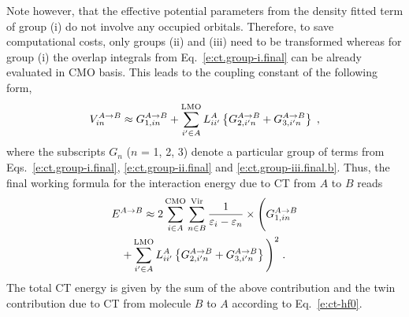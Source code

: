 \documentclass[aip,jcp,amsmath,amssymb,reprint,floatfix]{revtex4-1}
\begin{document}
Note however, that the effective potential parameters from the density fitted term of group (i) 
do not involve any occupied orbitals.
Therefore, to save computational costs, only groups (ii) and (iii) need to be transformed
whereas for group (i) the overlap integrals from Eq.~\eqref{e:ct.group-i.final} 
can be already evaluated in CMO basis.
This leads to the coupling constant of the following form,
%
\begin{equation} \label{e:ect-oep.final-vin}
   V_{in}^{A\rightarrow B} \approx 
%
   G_{1,in}^{A\rightarrow B} \\
  +
   \sum_{i'\in A}^{\rm LMO} L_{ii'}^A
   \left\{
   G_{2,i'n}^{A\rightarrow B}
  +G_{3,i'n}^{A\rightarrow B}
  \right\} \;,
\end{equation}
%
where the subscripts $G_n$ ($n$ = 1, 2, 3) denote a particular group of 
terms from Eqs.~\eqref{e:ct.group-i.final}, \eqref{e:ct.group-ii.final} 
and \eqref{e:ct.group-iii.final.b}.
Thus, the final working formula for the interaction energy due to CT from $A$ to $B$ reads
%
\begin{multline} \label{e:ect-oep.final}
 E^{A\rightarrow B} \approx
 2 
 \sum_{i\in A}^{\rm CMO}
 \sum_{n\in B}^{\rm Vir}
 \frac{1}{\varepsilon_i - \varepsilon_n} \times 
 \Bigg(
   G_{1,in}^{A\rightarrow B} \\
  +
   \sum_{i'\in A}^{\rm LMO} L_{ii'}^A
   \left\{
   G_{2,i'n}^{A\rightarrow B}
  +G_{3,i'n}^{A\rightarrow B}
  \right\}
 \Bigg)^2 \;.
\end{multline}
%
The total CT energy is given by the sum of the above contribution and the twin contribution
due to CT from molecule $B$ to $A$ according to Eq.~\eqref{e:ct-hf0}.

%
%
\end{document}
